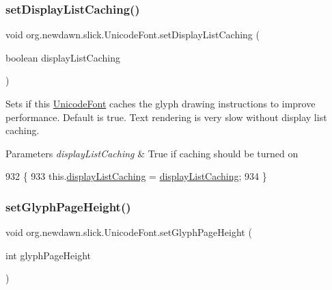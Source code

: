 \subsubsection{\texorpdfstring{set\+Display\+List\+Caching()}{setDisplayListCaching()}}
{\footnotesize\ttfamily void org.\+newdawn.\+slick.\+Unicode\+Font.\+set\+Display\+List\+Caching (\begin{DoxyParamCaption}\item[{boolean}]{display\+List\+Caching }\end{DoxyParamCaption})\hspace{0.3cm}{\ttfamily [inline]}}

Sets if this \mbox{\hyperlink{classorg_1_1newdawn_1_1slick_1_1_unicode_font}{Unicode\+Font}} caches the glyph drawing instructions to improve performance. Default is true. Text rendering is very slow without display list caching.


\begin{DoxyParams}{Parameters}
{\em display\+List\+Caching} & True if caching should be turned on \\
\hline
\end{DoxyParams}

\begin{DoxyCode}
932                                                                    \{
933         this.\mbox{\hyperlink{classorg_1_1newdawn_1_1slick_1_1_unicode_font_aad1040617fd0167c54d6dd3511c6bd48}{displayListCaching}} = \mbox{\hyperlink{classorg_1_1newdawn_1_1slick_1_1_unicode_font_aad1040617fd0167c54d6dd3511c6bd48}{displayListCaching}};
934     \}
\end{DoxyCode}
\mbox{\label{classorg_1_1newdawn_1_1slick_1_1_unicode_font_aae86b4ba382762f890288ca53127074e}} 
\subsubsection{\texorpdfstring{set\+Glyph\+Page\+Height()}{setGlyphPageHeight()}}
{\footnotesize\ttfamily void org.\+newdawn.\+slick.\+Unicode\+Font.\+set\+Glyph\+Page\+Height (\begin{DoxyParamCaption}\item[{int}]{glyph\+Page\+Height }\end{DoxyParamCaption})\hspace{0.3cm}{\ttfamily [inline]}}

